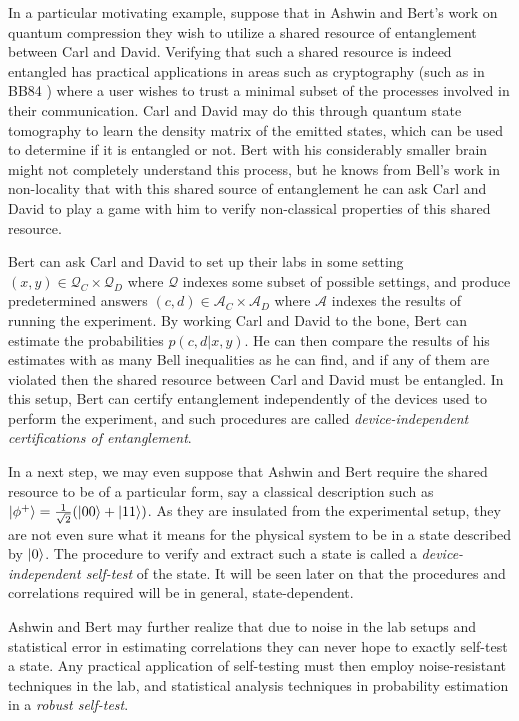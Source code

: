 \documentclass[runningheads,a4paper,english]{llncs}[2022/01/12]
\newcommand{\mcA}{\ensuremath{\mathcal{A}}}
\newcommand{\mcQ}{\ensuremath{\mathcal{Q}}}
\DeclarePairedDelimiter\ket{\lvert}{\rangle}
\begin{document}
In a particular motivating example, suppose that in Ashwin and Bert's work on quantum compression they wish to utilize a shared resource of entanglement between Carl and David.
Verifying that such a shared resource is indeed entangled has practical applications in areas such as cryptography (such as in BB84 \cite{Bennett_2014}) where a user wishes to trust a minimal subset of the processes involved in their communication. 
Carl and David may do this through quantum state tomography to learn the density matrix of the emitted states, which can be used to determine if it is entangled or not.
Bert with his considerably smaller brain might not completely understand this process, but he knows from Bell's work in non-locality \cite{bell64} that with this shared source of entanglement he can ask Carl and David to play a game with him to verify non-classical properties of this shared resource.

Bert can ask Carl and David to set up their labs in some setting $(x, y) \in \mcQ_C\times \mcQ_D$ where $\mcQ$ indexes some subset of possible settings, and produce predetermined answers $(c, d) \in \mcA_C \times \mcA_D$ where $\mcA$ indexes the results of running the experiment.
By working Carl and David to the bone, Bert can estimate the probabilities $p(c,d | x,y)$.
He can then compare the results of his estimates with as many Bell inequalities as he can find, and if any of them are violated then the shared resource between Carl and David must be entangled.
In this setup, Bert can certify entanglement independently of the devices used to perform the experiment, and such procedures are called \textit{device-independent certifications of entanglement}.

In a next step, we may even suppose that Ashwin and Bert require the shared resource to be of a particular form, say a classical description such as $\ket{\phi^+} = \frac{1}{\sqrt{2}}(\ket{00} + \ket{11})$.
As they are insulated from the experimental setup, they are not even sure what it means for the physical system to be in a state described by $\ket{0}$.
The procedure to verify and extract such a state is called a \textit{device-independent self-test} of the state.
It will be seen later on that the procedures and correlations required will be in general, state-dependent.

Ashwin and Bert may further realize that due to noise in the lab setups and statistical error in estimating correlations they can never hope to exactly self-test a state.
Any practical application of self-testing must then employ noise-resistant techniques in the lab, and statistical analysis techniques in probability estimation in a \textit{robust self-test}.
\end{document}
